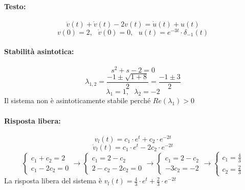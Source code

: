 \documentclass[a4paper]{article}
\begin{document}
	\paragraph{Testo:}
	\[ \ddot{v}(t) + \dot{v}(t)	- 2 v(t) = \dot{u}(t) + u(t) \]
	\[ v(0) = 2, \text{ } \dot{v}(0) = 0, \text{ } u(t) = e^{-3t} \cdot \delta_{-1}(t) \]
	
	\paragraph{Stabilità asintotica:}
	\[ s^2 + s - 2 = 0 \]
	\[ \lambda_{1,2} = \frac{-1 \pm \sqrt{1 + 8}}{2} = \frac{-1 \pm 3}{2}\]
	\[ \lambda_1 = 1, \text{ } \lambda_2 = -2 \]
	Il sistema non è asintoticamente stabile perché $Re(\lambda_1)>0$
	
	\paragraph{Risposta libera:}
	\[ v_l(t) = c_1 \cdot e^t + c_2 \cdot e^{-2t} \]
	\[ \dot{v}_l(t) = c_1 \cdot e^t - 2 c_2 \cdot e^{-2t} \]
	\[
	\begin{cases}
		c_1 + c_2 = 2 \\
		c_1 - 2 c_2 = 0
	\end{cases}
	\longrightarrow
	\begin{cases}
		c_1 = 2 - c_2 \\
		2 - c_2 -2 c_2 = 0
	\end{cases}
	\longrightarrow
	\begin{cases}
		c_1 = 2 - c_2 \\
		-3 c_2 = -2
	\end{cases}
	\longrightarrow
	\begin{cases}
		c_1 = \frac{4}{3} \\
		c_2 = \frac{2}{3}
	\end{cases}
	\]
	La risposta libera del sistema è $v_l(t) = \frac{4}{3} \cdot e^t + \frac{2}{3} \cdot e^{-2t}$
	
\end{document}
